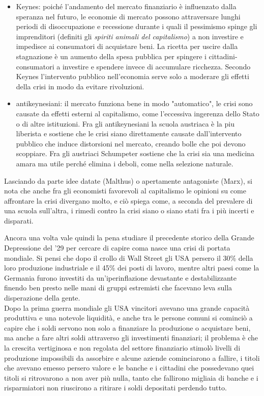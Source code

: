 \documentclass[11pt]{article}
\begin{document}
\begin{itemize}
\item Keynes: poich\'e l'andamento del mercato finanziario
\`e influenzato dalla speranza nel futuro, le economie di mercato possono attraversare lunghi periodi di 
disoccupazione e recessione durante i quali il pessimismo spinge gli imprenditori (definiti gli \emph{spiriti animali del capitalismo})
a non investire e impedisce ai consumatori di acquistare beni. La ricetta per uscire dalla stagnazione 
\`e un aumento della spesa pubblica per spingere i cittadini-consumatori 
a investire e spendere invece di accumulare ricchezza.
Secondo Keynes l'intervento pubblico nell'economia serve solo a moderare gli effetti
della crisi in modo da evitare rivoluzioni.

\item antikeynesiani: il mercato funziona bene in modo "automatico", le crisi sono causate da effetti esterni al capitalismo,
come l'eccessiva ingerenza dello Stato o di altre istituzioni.
Fra gli antikeynesiani la scuola austriaca \`e la piu liberista e sostiene che le crisi siano 
direttamente causate dall'intervento pubblico che
induce distorsioni nel mercato, creando bolle che poi devono scoppiare. Fra gli austriaci
Schumpeter sostiene che la crisi sia una medicina amara ma utile perch\'e elimina i deboli, come nella selezione naturale.
\end{itemize}

Lasciando da parte idee datate (Malthus) o apertamente antagoniste (Marx), si nota che anche fra gli economisti
favorevoli al capitalismo le opinioni su come affrontare la crisi divergano molto, e ci\`o spiega
come, a seconda del prevalere di una scuola sull'altra, i rimedi contro la crisi siano o siano stati fra i pi\`u incerti e disparati. 

Ancora una volta vale quindi la pena studiare il precedente storico della Grande Depressione del '29
per cercare di capire coma nasce una crisi di portata mondiale.
Si pensi che dopo il crollo di Wall Street gli USA persero il
30\% della loro produzione industriale e il 45\% dei posti di lavoro,
mentre altri paesi come la Germania furono investiti da un'iperinflazione devastante
e destabilizzante finendo ben presto nelle mani di gruppi estremisti che facevano leva sulla disperazione
della gente.\\
Dopo la prima guerra mondiale gli USA vincitori avevano una grande capacit\`a produttiva e 
una notevole liquidit\`a, e anche tra le persone comuni si cominci\`o a capire che i soldi servono 
non solo a finanziare la produzione o acquistare beni, ma anche a fare altri soldi attraverso
gli investimenti finanziari; il problema \`e che la crescita vertiginosa e non regolata
del settore finanziario stimol\`o livelli di produzione impossibili da assorbire
e alcune aziende cominciarono a fallire, i titoli che avevano emesso persero valore e le banche e i cittadini
che possedevano quei titoli si ritrovarono a non aver pi\`u nulla, tanto che
fallirono migliaia di banche e i risparmiatori non riuscirono a ritirare i 
soldi depositati perdendo tutto.
\end{document}
